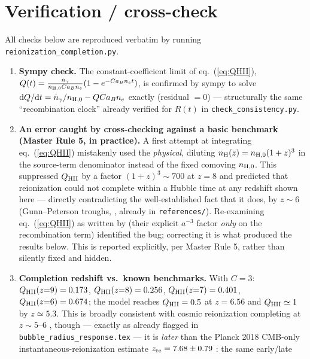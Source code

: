 \documentclass[11pt,a4paper]{article}
\begin{document}
\section{Verification / cross-check}
\label{sec:verification}

All checks below are reproduced verbatim by running \texttt{reionization\_completion.py}.

\begin{enumerate}
\item \textbf{Sympy check.} The constant-coefficient limit of eq.~(\ref{eq:QHII}),
      $Q(t)=\tfrac{\dot n_\gamma}{n_{{\rm H},0}Ca_Bn_e}(1-e^{-Ca_Bn_et})$, is confirmed by sympy to solve
      $\mathrm{d}Q/\mathrm{d}t=\dot n_\gamma/n_{{\rm H},0}-QCa_Bn_e$ exactly (residual $=0$) --- structurally
      the same ``recombination clock'' already verified for $R(t)$ in \texttt{check\_consistency.py}.
\item \textbf{An error caught by cross-checking against a basic benchmark (Master Rule 5, in practice).} A
      first attempt at integrating eq.~(\ref{eq:QHII}) mistakenly used the \emph{physical}, diluting
      $n_{\rm H}(z)=n_{{\rm H},0}(1+z)^3$ in the source-term denominator instead of the fixed comoving
      $n_{{\rm H},0}$. This suppressed $Q_{\rm HII}$ by a factor $(1+z)^3\sim700$ at $z=8$ and predicted that
      reionization could not complete within a Hubble time at any redshift shown here --- directly
      contradicting the well-established fact that it does, by $z\sim6$ (Gunn--Peterson troughs,
      \citealt{White2003}, already in \texttt{references/}). Re-examining eq.~(\ref{eq:QHII}) as written by
      \citet{Choudhury2022} (their explicit $a^{-3}$ factor \emph{only} on the recombination term) identified
      the bug; correcting it is what produced the results below. This is reported explicitly, per Master Rule
      5, rather than silently fixed and hidden.
\item \textbf{Completion redshift vs.\ known benchmarks.} With $C=3$: $Q_{\rm HII}(z{=}9)=0.173$,
      $Q_{\rm HII}(z{=}8)=0.256$, $Q_{\rm HII}(z{=}7)=0.401$, $Q_{\rm HII}(z{=}6)=0.674$; the model reaches
      $Q_{\rm HII}=0.5$ at $z=6.56$ and $Q_{\rm HII}\simeq1$ by $z\simeq5.3$. This is broadly consistent with
      cosmic reionization completing at $z\sim5$--$6$ \citep{White2003}, though --- exactly as already flagged
      in \texttt{bubble\_radius\_response.tex} --- it is \emph{later} than the Planck 2018 CMB-only
      instantaneous-reionization estimate $z_{\rm re}=7.68\pm0.79$ \citep{Planck2018VI}: the same early/late

\end{enumerate}
\end{document}
